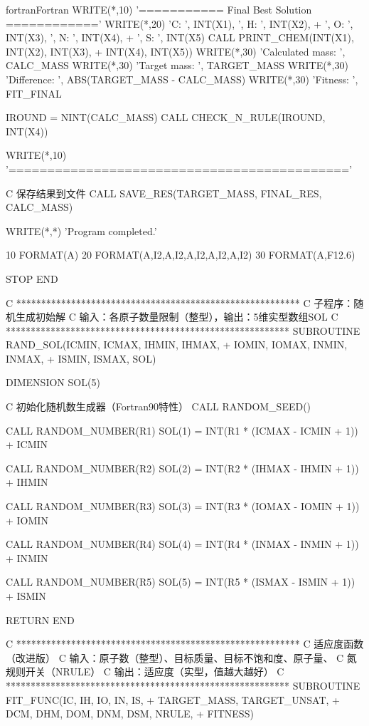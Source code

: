 \begin{envcode}{fortran}{Fortran}
      WRITE(*,10) '=========== Final Best Solution ============'
      WRITE(*,20) 'C: ', INT(X1), ', H: ', INT(X2),
     +            ', O: ', INT(X3), ', N: ', INT(X4),
     +            ', S: ', INT(X5)
      CALL PRINT_CHEM(INT(X1), INT(X2), INT(X3),
     +                INT(X4), INT(X5))
      WRITE(*,30) 'Calculated mass: ', CALC_MASS
      WRITE(*,30) 'Target mass:     ', TARGET_MASS
      WRITE(*,30) 'Difference:      ', ABS(TARGET_MASS - CALC_MASS)
      WRITE(*,30) 'Fitness:         ', FIT_FINAL
      
      IROUND = NINT(CALC_MASS)
      CALL CHECK_N_RULE(IROUND, INT(X4))
      
      WRITE(*,10) '============================================'


C     保存结果到文件
      CALL SAVE_RES(TARGET_MASS, FINAL_RES, CALC_MASS)
      
      WRITE(*,*) 'Program completed.'
      
10    FORMAT(A)
20    FORMAT(A,I2,A,I2,A,I2,A,I2,A,I2)
30    FORMAT(A,F12.6)
      
      STOP
      END
      
C     *********************************************************
C     子程序：随机生成初始解
C     输入：各原子数量限制（整型），输出：5维实型数组SOL
C     *********************************************************
      SUBROUTINE RAND_SOL(ICMIN, ICMAX, IHMIN, IHMAX,
     +                    IOMIN, IOMAX, INMIN, INMAX,
     +                    ISMIN, ISMAX, SOL)
      
      DIMENSION SOL(5)
      
C     初始化随机数生成器（Fortran90特性）
      CALL RANDOM_SEED()
      
      CALL RANDOM_NUMBER(R1)
      SOL(1) = INT(R1 * (ICMAX - ICMIN + 1)) + ICMIN
      
      CALL RANDOM_NUMBER(R2)
      SOL(2) = INT(R2 * (IHMAX - IHMIN + 1)) + IHMIN
      
      CALL RANDOM_NUMBER(R3)
      SOL(3) = INT(R3 * (IOMAX - IOMIN + 1)) + IOMIN
      
      CALL RANDOM_NUMBER(R4)
      SOL(4) = INT(R4 * (INMAX - INMIN + 1)) + INMIN
      
      CALL RANDOM_NUMBER(R5)
      SOL(5) = INT(R5 * (ISMAX - ISMIN + 1)) + ISMIN
      
      RETURN
      END
      
C     *********************************************************
C     适应度函数（改进版）
C     输入：原子数（整型）、目标质量、目标不饱和度、原子量、
C           氮规则开关（NRULE）
C     输出：适应度（实型，值越大越好）
C     *********************************************************
      SUBROUTINE FIT_FUNC(IC, IH, IO, IN, IS, 
     +                    TARGET_MASS, TARGET_UNSAT,
     +                    DCM, DHM, DOM, DNM, DSM, NRULE,
     +                    FITNESS)
      

\end{envcode}
